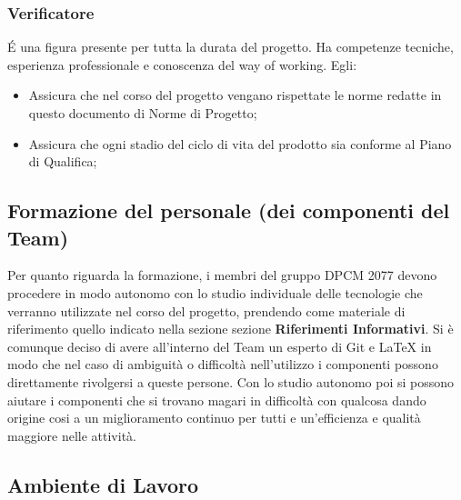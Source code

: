 \subsubsection{Verificatore}
\'E una figura presente per tutta la durata del progetto. Ha competenze tecniche, esperienza professionale e conoscenza del way of working.	
Egli:
\begin{itemize}
\item{Assicura che nel corso del progetto vengano rispettate le norme redatte in questo documento di Norme di Progetto;}
\item{Assicura che ogni stadio del ciclo di vita del prodotto sia conforme al Piano di Qualifica;}
\end{itemize}


\subsection{Formazione del personale (dei componenti del Team)}
Per quanto riguarda la formazione, i membri del gruppo DPCM 2077 devono procedere in modo autonomo con lo studio individuale delle tecnologie che verranno utilizzate nel corso del progetto, prendendo come materiale di riferimento quello indicato nella sezione sezione \textbf{Riferimenti Informativi}. Si è comunque deciso di avere all'interno del Team un esperto di Git e {\LaTeX} in modo che nel caso di ambiguità o difficoltà nell'utilizzo i componenti possono direttamente
rivolgersi a queste persone. Con lo studio autonomo poi si possono aiutare i componenti che si trovano magari in difficoltà con qualcosa dando origine cosi a un miglioramento continuo per tutti e un'efficienza e qualità maggiore nelle attività.


\subsection{Ambiente di Lavoro}

